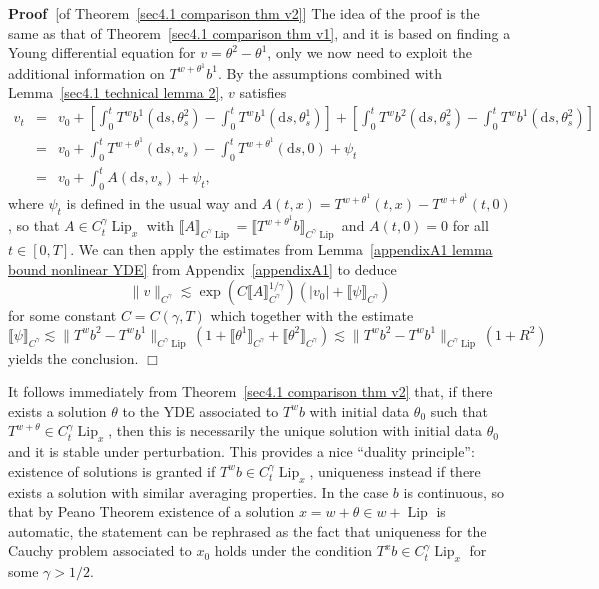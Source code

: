 \documentclass[10pt]{article}
\newcommand{\mathd}{\mathrm{d}}
\newcommand{\tmop}[1]{\ensuremath{\operatorname{#1}}}
\newenvironment{proof}{\noindent\textbf{Proof\ }}{\hspace*{\fill}$\Box$\medskip}
\begin{document}
\begin{proof}[of Theorem~\ref{sec4.1 comparison thm v2}]
  The idea of the proof is the same as that of Theorem~\ref{sec4.1 comparison
  thm v1}, and it is based on finding a Young differential equation for $v =
  \theta^2 - \theta^1$, only we now need to exploit the additional information
  on $T^{w + \theta^1} b^1$. By the assumptions combined with
  Lemma~\ref{sec4.1 technical lemma 2}, $v$ satisfies
  \begin{eqnarray*}
    v_t & = & v_0 + \left[ \int_0^t T^w b^1 (\mathd s, \theta^2_s) - \int_0^t
    T^w b^1 (\mathd s, \theta^1_s) \right] + \left[ \int_0^t T^w b^2 (\mathd
    s, \theta^2_s) - \int_0^t T^w b^1 (\mathd s, \theta^2_s) \right]\\
    & = & v_0 + \int_0^t T^{w + \theta^1} (\mathd s, v_s) - \int_0^t T^{w +
    \theta^1} (\mathd s, 0) + \psi_t\\
    & = & v_0 + \int_0^t A (\mathd s, v_s) + \psi_t,
  \end{eqnarray*}
  where $\psi_t$ is defined in the usual way and $A (t, x) = T^{w + \theta^1}
  (t, x) - T^{w + \theta^1} (t, 0)$, so that $A \in C^{\gamma}_t \tmop{Lip}_x$
  with $\llbracket A \rrbracket_{C^{\gamma} \tmop{Lip}} = \llbracket T^{w +
  \theta^1} b \rrbracket_{C^{\gamma} \tmop{Lip}}$ and $A (t, 0) = 0$ for all
  $t \in [0, T]$. We can then apply the estimates from Lemma~\ref{appendixA1
  lemma bound nonlinear YDE} from Appendix~\ref{appendixA1} to deduce
  \[ \| v \|_{C^{\gamma}} \lesssim \exp (C \llbracket A
     \rrbracket_{C^{\gamma}}^{1 / \gamma}) (| v_0 | + \llbracket \psi
     \rrbracket_{C^{\gamma}}) \]
  for some constant $C = C (\gamma, T)$ which together with the estimate
  \[ \llbracket \psi \rrbracket_{C^{\gamma}} \lesssim \| T^w b^2 - T^w b^1
     \|_{C^{\gamma} \tmop{Lip}} (1 + \llbracket \theta^1
     \rrbracket_{C^{\gamma}} + \llbracket \theta^2 \rrbracket_{C^{\gamma}})
     \lesssim \| T^w b^2 - T^w b^1 \|_{C^{\gamma} \tmop{Lip}} (1 + R^2) \]
  yields the conclusion.
\end{proof}

\begin{remark}
  \label{sec4.1 final remark}It follows immediately from Theorem~\ref{sec4.1
  comparison thm v2} that, if there exists a solution $\theta$ to the YDE
  associated to $T^w b$ with initial data $\theta_0$ such that $T^{w + \theta}
  \in C^{\gamma}_t \tmop{Lip}_x$, then this is necessarily the unique solution
  with initial data $\theta_0$ and it is stable under perturbation. This
  provides a nice ``duality principle'': existence of solutions is granted if
  $T^w b \in C^{\gamma}_t \tmop{Lip}_x$, uniqueness instead if there exists a
  solution with similar averaging properties. In the case $b$ is continuous,
  so that by Peano Theorem existence of a solution $x = w + \theta \in w +
  \tmop{Lip}$ is automatic, the statement can be rephrased as the fact that
  uniqueness for the Cauchy problem associated to $x_0$ holds under the
  condition $T^x b \in C^{\gamma}_t \tmop{Lip}_x$ for some $\gamma > 1 / 2$.
\end{remark}
\end{document}
